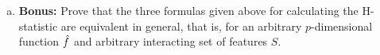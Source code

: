 {\begin{enumerate}[a)]
    \textit{Note:} The first two formulas (using raw sums) are convenient for computation on finite samples or discrete distributions; the third formula (using variances) is most useful for theoretical analysis and proofs.

    \item \textbf{Bonus:} Prove that the three formulas given above for calculating the H-statistic are equivalent in general, that is, for an arbitrary $p$-dimensional function $\hat{f}$ and arbitrary interacting set of features $S$.
    
\end{enumerate}

}